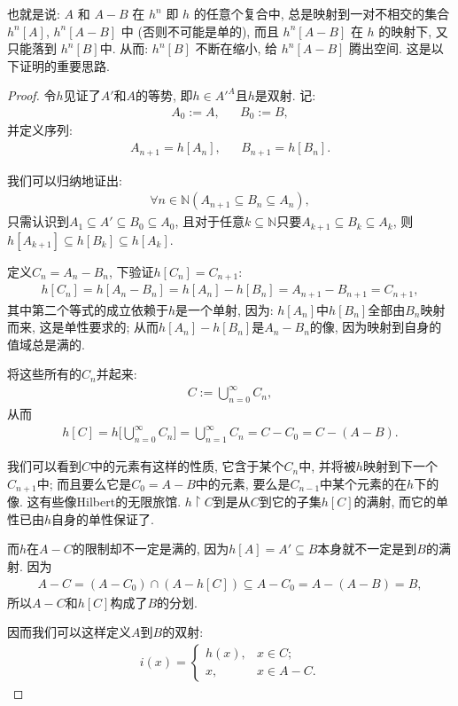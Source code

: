 \documentclass[openany]{ctexbook}
\theoremstyle{plain}
\theoremstyle{definition}
\begin{document}
也就是说: $A$ 和 $A-B$ 在 $h^n$ 即 $h$ 的任意个复合中, 总是映射到一对不相交的集合 $h^n [A]$, $h^n [A-B]$ 中 (否则不可能是单的), 而且 $h^n[A-B]$ 在 $h$ 的映射下, 又只能落到 $h^n[B]$中. 
从而: $h^n[B]$ 不断在缩小, 给 $h^n[A-B]$ 腾出空间. 
这是以下证明的重要思路.
\begin{proof}
令$h$见证了$A'$和$A$的等势, 即$h\in A'^A$且$h$是双射.
记:
\begin{align*}
	A_0 := A, && 
	B_0 := B,
\end{align*}
并定义序列:
\begin{align*}
	A_{n+1}=h[A_n], &&
	B_{n+1}=h[B_n].
\end{align*}

我们可以归纳地证出:
\begin{align*}
	\forall n\in \mathbb N(
		A_{n+1}\subseteq B_n \subseteq A_n),
\end{align*}
只需认识到$A_1\subseteq A' \subseteq B_0\subseteq A_0$, 
且对于任意$k\subseteq \mathbb N$只要$A_{k+1}\subseteq B_k \subseteq A_k$,
	则$h[A_{k+1}]\subseteq h[B_k]\subseteq  h[A_k]$.
	
定义$C_n = A_n - B_n$, 下验证$h[C_n] = C_{n+1}$: 
\begin{align*}
	h[C_n] = h[A_n - B_n] = h[A_n] - h[B_n] = A_{n+1} - B_{n+1} = C_{n+1}, 
\end{align*}
其中第二个等式的成立依赖于$h$是一个单射, 因为: $h[A_n] $中$h[B_n]$全部由$B_n$映射而来, 这是单性要求的; 从而$h[A_n]-h[B_n]$是$A_n-B_n$的像, 因为映射到自身的值域总是满的.

将这些所有的$C_n$并起来:
\begin{align*}
	C:=\bigcup^\infty_{n=0} C_n,
\end{align*}
从而
\begin{align*}
	h[C] = h\bigg\lbrack\bigcup^\infty_{n=0} C_n\bigg\rbrack = \bigcup^\infty_{n=1} C_n = C - C_0 = C- (A-B).
\end{align*}

我们可以看到$C$中的元素有这样的性质, 它含于某个$C_n$中, 并将被$h$映射到下一个$C_{n+1}$中; 而且要么它是$C_0=A-B$中的元素, 要么是$C_{n-1}$中某个元素的在$h$下的像. 这有些像Hilbert的无限旅馆. $h\upharpoonright C$到是从$C$到它的子集$h[C]$的满射, 而它的单性已由$h$自身的单性保证了. 

而$h$在$A-C$的限制却不一定是满的, 因为$h[A]=A'\subseteq B$本身就不一定是到$B$的满射. 因为
\begin{align*}
	A-C = (A - C_0) \cap (A-h[C]) \subseteq A-C_0 = A-(A-B) =B,
\end{align*}
所以$A-C$和$h[C]$构成了$B$的分划.

因而我们可以这样定义$A$到$B$的双射:
\begin{align*}
	i(x)=
	\begin{cases}
	h(x), & x\in C;\\
	x, & x\in A-C.
	\end{cases}
\end{align*}
\end{proof}
\end{document}
